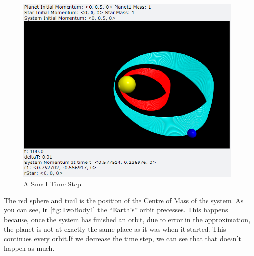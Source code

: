 \documentclass[12pt]{article}
\begin{document}
\begin{enumerate}
        \begin{figure}[h]
            \begin{center}
               \includegraphics[scale=.5]{TwoBody1.png}
               \caption{A Small Time Step}
               \label{fig:TwoBody1}
            \end{center}
        \end{figure}
        \noindent
        The red sphere and trail is the position of the Centre of Mass of the system. As you can 
        see, in \autoref{fig:TwoBody1} the ``Earth's'' orbit precesses. This happens because, once the 
        system has finished an orbit, due to error in the approximation, the planet is not at exactly 
        the same place as it was when it started. This continues every orbit.If we decrease the time 
        step, we can see that that doesn't happen as much. 


\end{enumerate}
\end{document}
